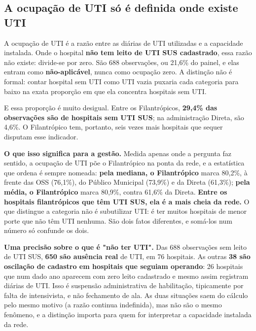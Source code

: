 \subsection*{A ocupação de UTI só é definida onde existe UTI}

A ocupação de UTI é a razão entre as diárias de UTI utilizadas e a
capacidade instalada. Onde o hospital \textbf{não tem leito de UTI SUS
cadastrado}, essa razão não existe: divide-se por zero. São 688
observações, ou 21,6\% do painel, e elas entram como
\textbf{não-aplicável}, nunca como ocupação zero. A distinção não é
formal: contar hospital sem UTI como UTI vazia puxaria cada categoria
para baixo na exata proporção em que ela concentra hospitais sem UTI.

E essa proporção é muito desigual. Entre os Filantrópicos, \textbf{29,4\%
das observações são de hospitais sem UTI SUS}; na administração Direta, são
4,6\%. O Filantrópico tem, portanto, seis vezes mais hospitais que sequer
disputam esse indicador.

\textbf{O que isso significa para a gestão.} Medida apenas onde a pergunta
faz sentido, a ocupação de UTI põe o Filantrópico na ponta da rede, e a
estatística que ordena é sempre nomeada: \textbf{pela mediana, o
Filantrópico} marca 80,2\%, à frente das OSS (76,1\%), do Público
Municipal (73,9\%) e da Direta (61,3\%); \textbf{pela média, o
Filantrópico} marca 80,9\%, contra 61,6\% da Direta. \textbf{Entre os
hospitais filantrópicos que têm UTI SUS, ela é a mais cheia da rede.} O que
distingue a categoria não é subutilizar UTI: é ter muitos hospitais de
menor porte que não têm UTI nenhuma. São dois fatos diferentes, e somá-los
num número só confunde os dois.

\textbf{Uma precisão sobre o que é "não ter UTI".} Das 688 observações sem
leito de UTI SUS, \textbf{650 são ausência real} de UTI, em 76 hospitais. As
outras \textbf{38 são oscilação de cadastro em hospitais que seguiam
operando}: 26 hospitais que num dado ano aparecem com zero leito
cadastrado e mesmo assim registram diárias de UTI. Isso é suspensão
administrativa de habilitação, tipicamente por falta de intensivista, e não
fechamento de ala. As duas situações saem do cálculo pelo mesmo motivo (a
razão continua indefinida), mas não são o mesmo fenômeno, e a distinção
importa para quem for interpretar a capacidade instalada da rede.

